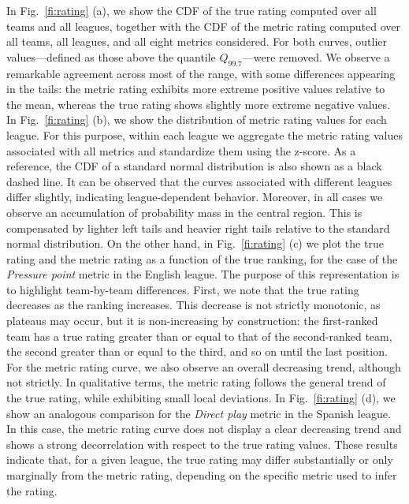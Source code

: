 \documentclass[preprint,12pt]{elsarticle}
\begin{document}
In Fig.~\ref{fi:rating} (a), we show the CDF of the true rating computed over all teams and all leagues, together with the CDF of the metric rating computed over all teams, all leagues, and all eight metrics considered. For both curves, outlier values—defined as those above the quantile $Q_{99.7}$—were removed.
%
We observe a remarkable agreement across most of the range, with some differences appearing in the tails: the metric rating exhibits more extreme positive values relative to the mean, whereas the true rating shows slightly more extreme negative values.
%
In Fig.~\ref{fi:rating} (b), we show the distribution of metric rating values for each league. For this purpose, within each league we aggregate the metric rating values associated with all metrics and standardize them using the z-score.
%
As a reference, the CDF of a standard normal distribution is also shown as a black dashed line.
It can be observed that the curves associated with different leagues differ slightly, indicating league-dependent behavior. Moreover, in all cases we observe an accumulation of probability mass in the central region. This is compensated by lighter left tails and heavier right tails relative to the standard normal distribution.
%
On the other hand, in Fig.~\ref{fi:rating} (c) we plot the true rating and the metric rating as a function of the true ranking, for the case of the {\it Pressure point} metric in the English league. The purpose of this representation is to highlight team-by-team differences.
%
First, we note that the true rating decreases as the ranking increases. This decrease is not strictly monotonic, as plateaus may occur, but it is non-increasing by construction: the first-ranked team has a true rating greater than or equal to that of the second-ranked team, the second greater than or equal to the third, and so on until the last position.
%
For the metric rating curve, we also observe an overall decreasing trend, although not strictly. In qualitative terms, the metric rating follows the general trend of the true rating, while exhibiting small local deviations.
%
In Fig.~\ref{fi:rating} (d), we show an analogous comparison for the {\it Direct play} metric in the Spanish league. In this case, the metric rating curve does not display a clear decreasing trend and shows a strong decorrelation with respect to the true rating values.
%
These results indicate that, for a given league, the true rating may differ substantially or only marginally from the metric rating, depending on the specific metric used to infer the rating.
\end{document}
